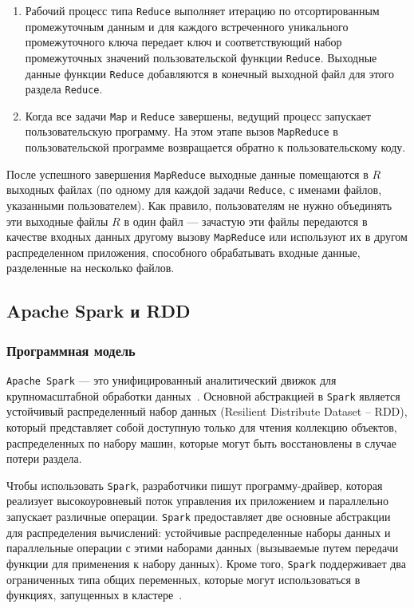 \begin{enumerate}
  \item Рабочий процесс типа \texttt{Reduce} выполняет итерацию по отсортированным промежуточным данным и для каждого встреченного уникального промежуточного ключа передает ключ и соответствующий набор промежуточных значений пользовательской функции \texttt{Reduce}.
    Выходные данные функции \texttt{Reduce} добавляются в конечный выходной файл для этого раздела \texttt{Reduce}.
  \item Когда все задачи \texttt{Map} и \texttt{Reduce} завершены, ведущий процесс запускает пользовательскую программу. 
    На этом этапе вызов \texttt{MapReduce} в пользовательской программе возвращается обратно к пользовательскому коду.
\end{enumerate}

После успешного завершения \texttt{MapReduce} выходные данные помещаются в $R$ выходных файлах (по одному для каждой задачи \texttt{Reduce}, с именами файлов, указанными пользователем).
Как правило, пользователям не нужно объединять эти выходные файлы $R$ в один файл --- зачастую эти файлы передаются в качестве входных данных другому вызову \texttt{MapReduce} или используют их в другом распределенном приложения, способного обрабатывать входные данные, разделенные на несколько файлов.

\subsection{Apache Spark и RDD}

\subsubsection{Программная модель}

\texttt{Apache Spark} --- это унифицированный аналитический движок для крупномасштабной обработки данных~\cite{apache-spark}.
Основной абстракцией в \texttt{Spark} является устойчивый распределенный набор данных (Resilient Distribute Dataset -- RDD), который представляет собой доступную только для чтения коллекцию объектов, распределенных по набору машин, которые могут быть восстановлены в случае потери раздела.

Чтобы использовать \texttt{Spark}, разработчики пишут программу-драйвер, которая реализует высокоуровневый поток управления их приложением и параллельно запускает различные операции. 
\texttt{Spark} предоставляет две основные абстракции для распределения вычислений: устойчивые распределенные наборы данных и параллельные операции с этими наборами данных (вызываемые путем передачи функции для применения к набору данных).
Кроме того, \texttt{Spark} поддерживает два ограниченных типа общих переменных, которые могут использоваться в функциях, запущенных в кластере~\cite{180560}.


